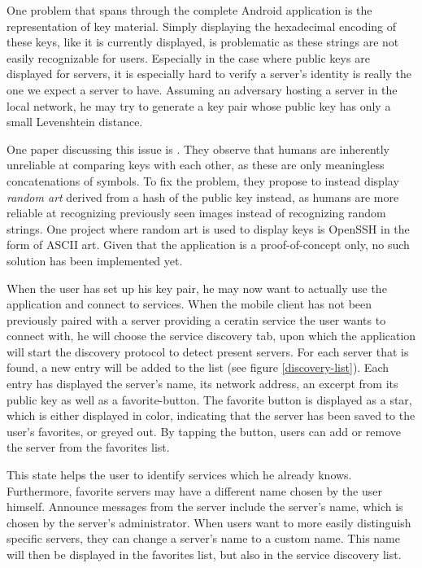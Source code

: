 One problem that spans through the complete Android application is the representation of key material.
Simply displaying the hexadecimal encoding of these keys, like it is currently displayed, is problematic as these strings are not easily recognizable for users.
Especially in the case where public keys are displayed for servers, it is especially hard to verify a server's identity is really the one we expect a server to have.
Assuming an adversary hosting a server in the local network, he may try to generate a key pair whose public key has only a small Levenshtein distance.

One paper discussing this issue is \cite{perrig1999hash}.
They observe that humans are inherently unreliable at comparing keys with each other, as these are only meaningless concatenations of symbols.
To fix the problem, they propose to instead display \emph{random art} derived from a hash of the public key instead, as humans are more reliable at recognizing previously seen images instead of recognizing random strings.
One project where random art is used to display keys is OpenSSH \cite{ylonen1996ssh} in the form of ASCII art.
Given that the application is a proof-of-concept only, no such solution has been implemented yet.

When the user has set up his key pair, he may now want to actually use the application and connect to services.
When the mobile client has not been previously paired with a server providing a ceratin service the user wants to connect with, he will choose the service discovery tab, upon which the application will start the discovery protocol to detect present servers.
For each server that is found, a new entry will be added to the list (see figure \ref{discovery-list}).
Each entry has displayed the server's name, its network address, an excerpt from its public key as well as a favorite-button.
The favorite button is displayed as a star, which is either displayed in color, indicating that the server has been saved to the user's favorites, or greyed out.
By tapping the button, users can add or remove the server from the favorites list.

This state helps the user to identify services which he already knows.
Furthermore, favorite servers may have a different name chosen by the user himself.
Announce messages from the server include the server's name, which is chosen by the server's administrator.
When users want to more easily distinguish specific servers, they can change a server's name to a custom name.
This name will then be displayed in the favorites list, but also in the service discovery list.


